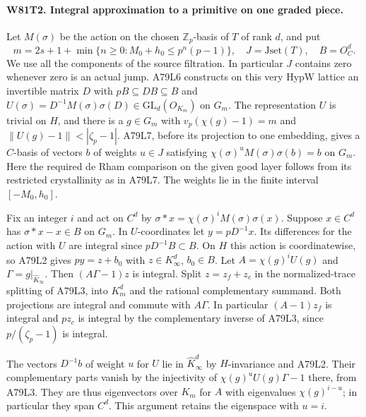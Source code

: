\paragraph{W81T2. Integral approximation to a primitive on one graded piece.}
Let $M(\sigma)$ be the action on the chosen $\mathbb Z_p$-basis of
$T$ of rank $d$, and put
\[
 m=2s+1+\min\{n\ge0:M_0+h_0\le p^n(p-1)\},\quad
 J=\mathrm{Jset}(T),\quad
 B=O_C^d.
\]
We use all the components of the source filtration. In particular
$J$ contains zero whenever zero is an actual jump. A79L6 constructs
on this very $\mathrm{HypW}$ lattice an invertible matrix $D$ with
$pB\subseteq DB\subseteq B$ and
$U(\sigma)=D^{-1}M(\sigma)\sigma(D)\in\mathrm{GL}_d(O_{K_m})$
on $G_m$. The representation $U$ is trivial on $H$, and there is
a $g\in G_m$ with $v_p(\chi(g)-1)=m$ and
$\|U(g)-1\|<|\zeta_p-1|$. A79L7, before its projection to one
embedding, gives a $C$-basis of vectors $b$ of weights $u\in J$
satisfying $\chi(\sigma)^uM(\sigma)\sigma(b)=b$ on $G_m$.
Here the required de Rham comparison on the given good layer
follows from its restricted crystallinity as in A79L7.
The weights lie in the finite interval $[-M_0,h_0]$.

Fix an integer $i$ and act on $C^d$ by
$\sigma*x=\chi(\sigma)^i M(\sigma)\sigma(x)$.
Suppose $x\in C^d$ has $\sigma*x-x\in B$ on $G_m$.
In $U$-coordinates let $y=pD^{-1}x$. Its differences for the
action with $U$ are integral since $pD^{-1}B\subset B$.
On $H$ this action is coordinatewise, so A79L2 gives
$py=z+b_0$ with $z\in K_\infty^d$, $b_0\in B$.
Let $A=\chi(g)^i U(g)$ and $\Gamma=g|_{\widehat K_\infty}$.
Then $(A\Gamma-1)z$ is integral. Split
$z=z_f+z_c$ in the normalized-trace splitting of A79L3, into
$K_m^d$ and the rational complementary summand. Both projections
are integral and commute with $A\Gamma$. In particular
$(A-1)z_f$ is integral and $p z_c$ is integral by the complementary
inverse of A79L3, since $p/(\zeta_p-1)$ is integral.

The vectors $D^{-1}b$ of weight $u$ for $U$ lie in
$\widehat K_\infty^d$ by $H$-invariance and A79L2. Their
complementary parts vanish by the injectivity of
$\chi(g)^uU(g)\Gamma-1$ there, from A79L3. They are thus eigenvectors
over $K_m$ for $A$ with eigenvalues $\chi(g)^{i-u}$; in particular
they span $C^d$. This argument retains the eigenspace with $u=i$.

